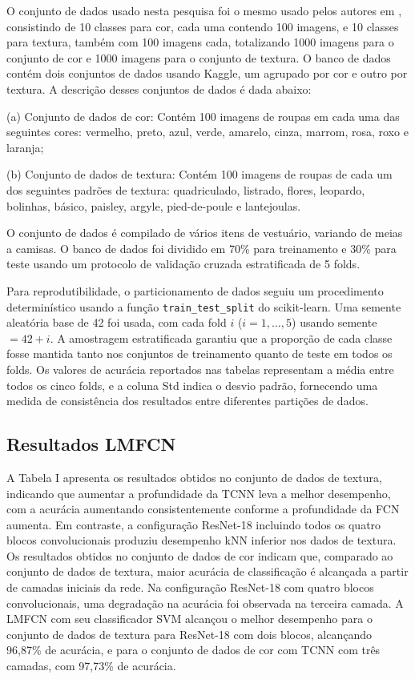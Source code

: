 \documentclass[conference]{IEEEtran}
\begin{document}
O conjunto de dados usado nesta pesquisa foi o mesmo usado pelos autores em \cite{b2}, consistindo de 10 classes para cor, cada uma contendo 100 imagens, e 10 classes para textura, tamb\'{e}m com 100 imagens cada, totalizando 1000 imagens para o conjunto de cor e 1000 imagens para o conjunto de textura. O banco de dados cont\'{e}m dois conjuntos de dados usando Kaggle, um agrupado por cor e outro por textura. A descri\c{c}\~{a}o desses conjuntos de dados \'{e} dada abaixo:

(a) Conjunto de dados de cor: Cont\'{e}m 100 imagens de roupas em cada uma das seguintes cores: vermelho, preto, azul, verde, amarelo, cinza, marrom, rosa, roxo e laranja;

(b) Conjunto de dados de textura: Cont\'{e}m 100 imagens de roupas de cada um dos seguintes padr\~{o}es de textura: quadriculado, listrado, flores, leopardo, bolinhas, b\'{a}sico, paisley, argyle, pied-de-poule e lantejoulas.

O conjunto de dados \'{e} compilado de v\'{a}rios itens de vestu\'{a}rio, variando de meias a camisas. O banco de dados foi dividido em 70\% para treinamento e 30\% para teste usando um protocolo de valida\c{c}\~{a}o cruzada estratificada de 5 folds.

Para reprodutibilidade, o particionamento de dados seguiu um procedimento determin\'{i}stico usando a fun\c{c}\~{a}o \texttt{train\_test\_split} do scikit-learn. Uma semente aleat\'{o}ria base de 42 foi usada, com cada fold $i$ ($i = 1, \ldots, 5$) usando semente $= 42 + i$. A amostragem estratificada garantiu que a propor\c{c}\~{a}o de cada classe fosse mantida tanto nos conjuntos de treinamento quanto de teste em todos os folds. Os valores de acur\'{a}cia reportados nas tabelas representam a m\'{e}dia entre todos os cinco folds, e a coluna Std indica o desvio padr\~{a}o, fornecendo uma medida de consist\^{e}ncia dos resultados entre diferentes parti\c{c}\~{o}es de dados.

\subsection{Resultados LMFCN}

A Tabela I apresenta os resultados obtidos no conjunto de dados de textura, indicando que aumentar a profundidade da TCNN leva a melhor desempenho, com a acur\'{a}cia aumentando consistentemente conforme a profundidade da FCN aumenta. Em contraste, a configura\c{c}\~{a}o ResNet-18 incluindo todos os quatro blocos convolucionais produziu desempenho kNN inferior nos dados de textura. Os resultados obtidos no conjunto de dados de cor indicam que, comparado ao conjunto de dados de textura, maior acur\'{a}cia de classifica\c{c}\~{a}o \'{e} alcan\c{c}ada a partir de camadas iniciais da rede. Na configura\c{c}\~{a}o ResNet-18 com quatro blocos convolucionais, uma degrada\c{c}\~{a}o na acur\'{a}cia foi observada na terceira camada. A LMFCN com seu classificador SVM alcan\c{c}ou o melhor desempenho para o conjunto de dados de textura para ResNet-18 com dois blocos, alcan\c{c}ando 96,87\% de acur\'{a}cia, e para o conjunto de dados de cor com TCNN com tr\^{e}s camadas, com 97,73\% de acur\'{a}cia.
\end{document}
